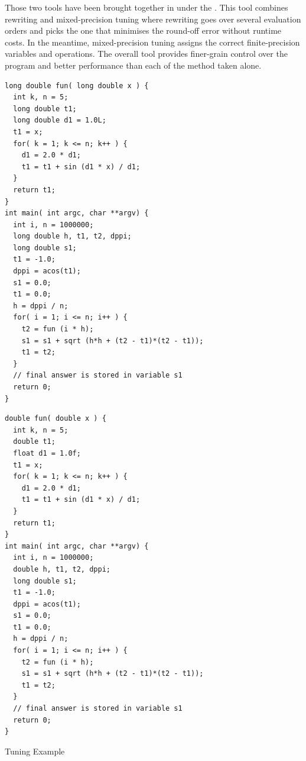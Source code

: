 Those two tools have been brought together in \cite{Darulova2018} under the . This tool combines rewriting and mixed-precision tuning where rewriting goes over several evaluation orders and picks the one that minimises the round-off error without runtime costs. In the meantime, mixed-precision tuning assigns the correct finite-precision variables and operations. The overall tool provides finer-grain control over the program and better performance than each of the method taken alone.
\begin{mylisting}[htbp]
\centering
\begin{minipage}{.48\textwidth}
\begin{lstlisting}[style=CInputStyle]
long double fun( long double x ) {
  int k, n = 5;
  long double t1;
  long double d1 = 1.0L;
  t1 = x;
  for( k = 1; k <= n; k++ ) {
    d1 = 2.0 * d1;
    t1 = t1 + sin (d1 * x) / d1;
  }
  return t1;
}
int main( int argc, char **argv) {
  int i, n = 1000000;
  long double h, t1, t2, dppi;
  long double s1;
  t1 = -1.0;
  dppi = acos(t1);
  s1 = 0.0;
  t1 = 0.0;
  h = dppi / n;
  for( i = 1; i <= n; i++ ) {
    t2 = fun (i * h);
    s1 = s1 + sqrt (h*h + (t2 - t1)*(t2 - t1));
    t1 = t2;
  }
  // final answer is stored in variable s1
  return 0;
}
\end{lstlisting}
\end{minipage}
\hfill
\begin{minipage}{.48\textwidth}
\begin{lstlisting}[style=CInputStyle]
double fun( double x ) {
  int k, n = 5;
  double t1;
  float d1 = 1.0f;
  t1 = x;
  for( k = 1; k <= n; k++ ) {
    d1 = 2.0 * d1;
    t1 = t1 + sin (d1 * x) / d1;
  }
  return t1;
}
int main( int argc, char **argv) {
  int i, n = 1000000;
  double h, t1, t2, dppi;
  long double s1;
  t1 = -1.0;
  dppi = acos(t1);
  s1 = 0.0;
  t1 = 0.0;
  h = dppi / n;
  for( i = 1; i <= n; i++ ) {
    t2 = fun (i * h);
    s1 = s1 + sqrt (h*h + (t2 - t1)*(t2 - t1));
    t1 = t2;
  }
  // final answer is stored in variable s1
  return 0;
}
\end{lstlisting}
\end{minipage}
\caption[Tuning]{Tuning Example \cite{Rubio2013}}
	\label{fig:Tuning}
\end{mylisting}


